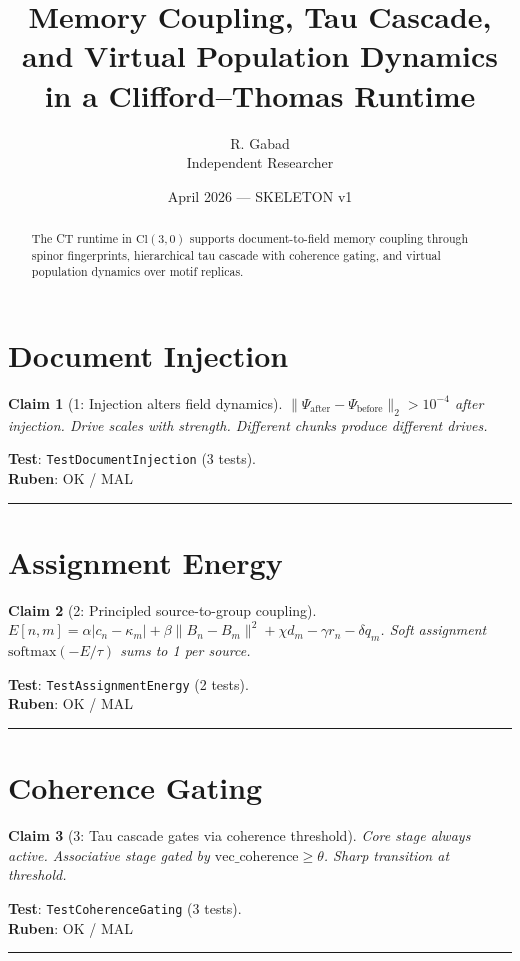 \documentclass[11pt,a4paper]{article}
\title{\textbf{Memory Coupling, Tau Cascade, and Virtual Population Dynamics\\in a Clifford--Thomas Runtime}}
\author{R. Gabad\\Independent Researcher}
\date{April 2026 --- SKELETON v1}
\newtheorem{claim}{Claim}
\begin{document}
\maketitle

\begin{abstract}
The CT runtime in $\mathrm{Cl}(3,0)$ supports document-to-field memory
coupling through spinor fingerprints, hierarchical tau cascade with
coherence gating, and virtual population dynamics over motif replicas.
\end{abstract}

\section{Document Injection}
\begin{claim}[1: Injection alters field dynamics]
$\|\Psi_{\mathrm{after}} - \Psi_{\mathrm{before}}\|_2 > 10^{-4}$ after injection.
Drive scales with strength. Different chunks produce different drives.
\end{claim}
\noindent\textbf{Test}: \texttt{TestDocumentInjection} (3 tests).\\[4pt]
\textbf{Ruben}: OK / MAL \rule{3cm}{0.4pt}

\section{Assignment Energy}
\begin{claim}[2: Principled source-to-group coupling]
$E[n,m] = \alpha|c_n - \kappa_m| + \beta\|B_n - B_m\|^2 + \chi d_m - \gamma r_n - \delta q_m$.
Soft assignment $\mathrm{softmax}(-E/\tau)$ sums to 1 per source.
\end{claim}
\noindent\textbf{Test}: \texttt{TestAssignmentEnergy} (2 tests).\\[4pt]
\textbf{Ruben}: OK / MAL \rule{3cm}{0.4pt}

\section{Coherence Gating}
\begin{claim}[3: Tau cascade gates via coherence threshold]
Core stage always active. Associative stage gated by
$\mathrm{vec\_coherence} \geq \theta$. Sharp transition at threshold.
\end{claim}
\noindent\textbf{Test}: \texttt{TestCoherenceGating} (3 tests).\\[4pt]
\textbf{Ruben}: OK / MAL \rule{3cm}{0.4pt}
\end{document}
